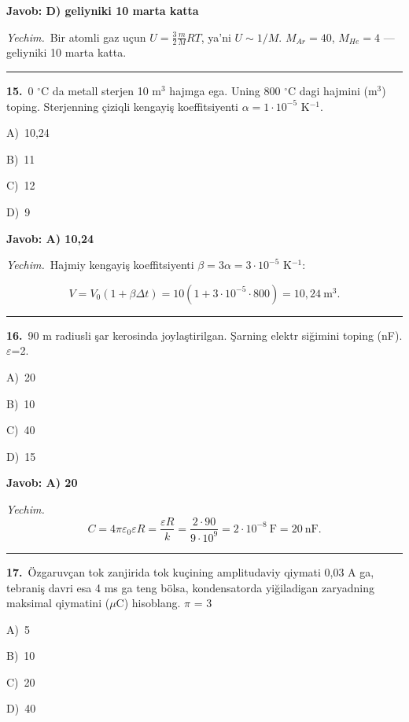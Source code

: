 \documentclass[11pt,a4paper]{article}
\newcommand{\opt}[2]{\hspace*{4mm}#1)\ #2\par}
\begin{document}
\noindent\colorbox{gray!12}{\parbox{\dimexpr\linewidth-2\fboxsep}{\textbf{Javob: D) geliyniki 10 marta katta}}}\par\smallskip
\noindent\textit{Yechim.}\ Bir atomli gaz uçun $U=\frac32\frac{m}{M}RT$, ya’ni $U\sim1/M$. $M_{Ar}=40$, $M_{He}=4$ — geliyniki 10 marta katta.\par\par\medskip\hrule\medskip
{}\noindent\begin{minipage}{\linewidth}
\textbf{15.}\ 0 $^\circ$C da metall sterjen 10 m$^{3}$ hajmga ega. Uning 800 $^\circ$C dagi hajmini (m$^{3}$) toping. Sterjenning çiziqli kengayiş koeffitsiyenti $\alpha=1\cdot10^{-5}$ K$^{-1}$.\par\smallskip
\opt{A}{10,24}
\opt{B}{11}
\opt{C}{12}
\opt{D}{9}
\end{minipage}\vspace{2pt}\par
\noindent\colorbox{gray!12}{\parbox{\dimexpr\linewidth-2\fboxsep}{\textbf{Javob: A) 10,24}}}\par\smallskip
\noindent\textit{Yechim.}\ Hajmiy kengayiş koeffitsiyenti $\beta=3\alpha=3\cdot10^{-5}$ K$^{-1}$:\par
\[V=V_0(1+\beta\Delta t)=10(1+3\cdot10^{-5}\cdot800)=10{,}24\ \text{m}^3.\]\par\medskip\hrule\medskip
{}\noindent\begin{minipage}{\linewidth}
\textbf{16.}\ 90 m radiusli şar kerosinda joylaştirilgan. Şarning elektr siğimini toping (nF). $\varepsilon$=2.\par\smallskip
\opt{A}{20}
\opt{B}{10}
\opt{C}{40}
\opt{D}{15}
\end{minipage}\vspace{2pt}\par
\noindent\colorbox{gray!12}{\parbox{\dimexpr\linewidth-2\fboxsep}{\textbf{Javob: A) 20}}}\par\smallskip
\noindent\textit{Yechim.}\ \[C=4\pi\varepsilon_0\varepsilon R=\frac{\varepsilon R}{k}=\frac{2\cdot90}{9\cdot10^9}=2\cdot10^{-8}\ \text{F}=20\ \text{nF}.\]\par\medskip\hrule\medskip
{}\noindent\begin{minipage}{\linewidth}
\textbf{17.}\ Özgaruvçan tok zanjirida tok kuçining amplitudaviy qiymati 0,03 A ga, tebraniş davri esa 4 ms ga teng bölsa, kondensatorda yiğiladigan zaryadning maksimal qiymatini ($\mu$C) hisoblang. $\pi$ = 3\par\smallskip
\opt{A}{5}
\opt{B}{10}
\opt{C}{20}
\opt{D}{40}
\end{minipage}\vspace{2pt}\par
\end{document}
